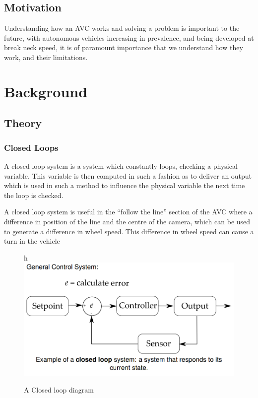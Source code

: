 \documentclass[paper=a4, fontsize=11pt]{scrartcl} %
\numberwithin{equation}{section} %
\numberwithin{figure}{section} %
\begin{document}
\subsection{Motivation}
Understanding how an AVC works and solving a problem is important to the future,
with autonomous vehicles increasing in prevalence, and being developed at break
neck speed, it is of paramount importance that we understand how they work, and
their limitations.
\section{Background}
\subsection{Theory}
\subsubsection{Closed Loops}
A closed loop system is a system which constantly loops, checking a physical
variable. This variable is then computed in such a fashion as to deliver an
output which is used in such a method to influence the physical variable the
next time the loop is checked.\autocite{elfClosedLoops}

A closed loop system is useful in the ``follow the line'' section of the AVC
where a difference in position of the line and the centre of the camera, which
can be used to generate a difference in wheel speed. This difference in wheel
speed can cause a turn in the vehicle

\begin{figure}{h}
\includegraphics[width=\textwidth]{closedloop}
\centering
\caption{A Closed loop diagram \autocite{elfClosedLoops}}
\end{figure}
\end{document}
